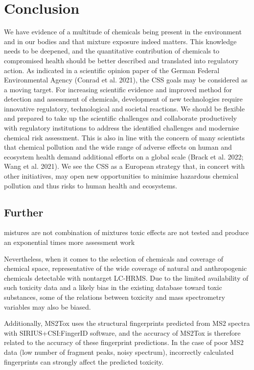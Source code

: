 \chapter{Conclusion}

We have evidence of a multitude of chemicals being present in the environment and in our bodies and that mixture exposure indeed matters. This knowledge needs to be deepened, and the quantitative contribution of chemicals to compromised health should be better described and translated into regulatory action. As indicated in a scientific opinion paper of the German Federal Environmental Agency (Conrad et al. 2021), the CSS goals may be considered as a moving target. For increasing scientific evidence and improved method for detection and assessment of chemicals, development of new technologies require innovative regulatory, technological and societal reactions. We should be flexible and prepared to take up the scientific challenges and collaborate productively with regulatory institutions to address the identified challenges and modernise chemical risk assessment. This is also in line with the concern of many scientists that chemical pollution and the wide range of adverse effects on human and ecosystem health demand additional efforts on a global scale (Brack et al. 2022; Wang et al. 2021). We see the CSS as a European strategy that, in concert with other initiatives, may open new opportunities to minimise hazardous chemical pollution and thus risks to human health and ecosystems.


\section{Further}
mistures are not combination of mixtures toxic effects are not tested and produce an exponential times more assessment work

Nevertheless, when it comes to the selection of chemicals and coverage of chemical space,  representative of the wide coverage of natural and anthropogenic chemicals detectable with nontarget LC-HRMS. Due to the limited availability of such toxicity data and a likely bias in the existing database toward toxic substances, some of the relations between toxicity and mass spectrometry variables may also be biased.


Additionally, MS2Tox uses the structural fingerprints predicted from MS2 spectra with SIRIUS+CSI:FingerID software, and the accuracy of MS2Tox is therefore related to the accuracy of these fingerprint predictions. In the case of poor MS2 data (low number of fragment peaks, noisy spectrum), incorrectly calculated fingerprints can strongly affect the predicted toxicity.

